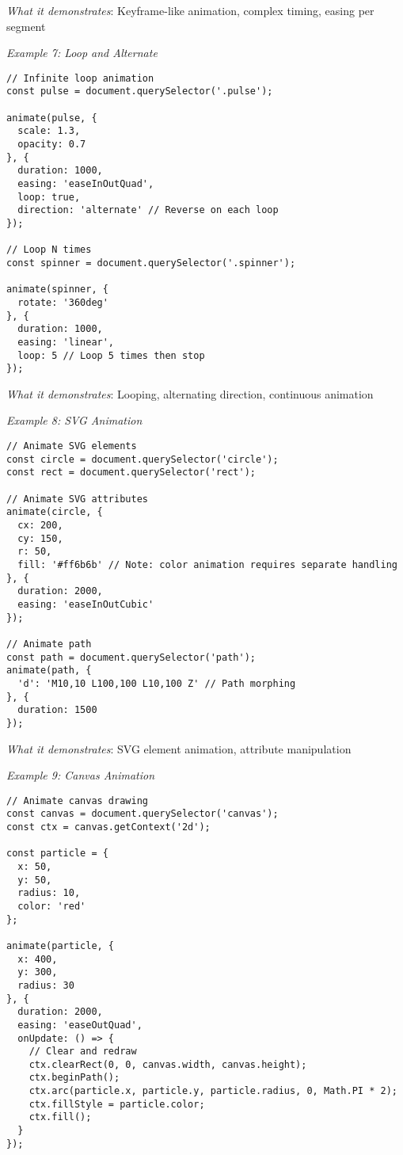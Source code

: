 \documentclass[11pt]{article}
\begin{document}
\emph{What it demonstrates}: Keyframe-like animation, complex timing, easing per segment

\emph{Example 7: Loop and Alternate}

\begin{verbatim}
// Infinite loop animation
const pulse = document.querySelector('.pulse');

animate(pulse, {
  scale: 1.3,
  opacity: 0.7
}, {
  duration: 1000,
  easing: 'easeInOutQuad',
  loop: true,
  direction: 'alternate' // Reverse on each loop
});

// Loop N times
const spinner = document.querySelector('.spinner');

animate(spinner, {
  rotate: '360deg'
}, {
  duration: 1000,
  easing: 'linear',
  loop: 5 // Loop 5 times then stop
});
\end{verbatim}

\emph{What it demonstrates}: Looping, alternating direction, continuous animation

\emph{Example 8: SVG Animation}

\begin{verbatim}
// Animate SVG elements
const circle = document.querySelector('circle');
const rect = document.querySelector('rect');

// Animate SVG attributes
animate(circle, {
  cx: 200,
  cy: 150,
  r: 50,
  fill: '#ff6b6b' // Note: color animation requires separate handling
}, {
  duration: 2000,
  easing: 'easeInOutCubic'
});

// Animate path
const path = document.querySelector('path');
animate(path, {
  'd': 'M10,10 L100,100 L10,100 Z' // Path morphing
}, {
  duration: 1500
});
\end{verbatim}

\emph{What it demonstrates}: SVG element animation, attribute manipulation

\emph{Example 9: Canvas Animation}

\begin{verbatim}
// Animate canvas drawing
const canvas = document.querySelector('canvas');
const ctx = canvas.getContext('2d');

const particle = {
  x: 50,
  y: 50,
  radius: 10,
  color: 'red'
};

animate(particle, {
  x: 400,
  y: 300,
  radius: 30
}, {
  duration: 2000,
  easing: 'easeOutQuad',
  onUpdate: () => {
    // Clear and redraw
    ctx.clearRect(0, 0, canvas.width, canvas.height);
    ctx.beginPath();
    ctx.arc(particle.x, particle.y, particle.radius, 0, Math.PI * 2);
    ctx.fillStyle = particle.color;
    ctx.fill();
  }
});
\end{verbatim}
\end{document}
